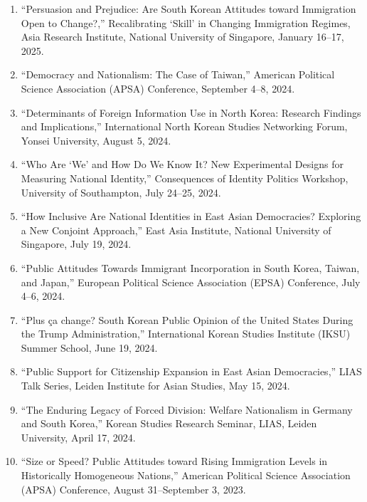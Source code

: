 \documentclass[11pt, a4paper]{article}
\begin{document}
\begin{enumerate}[itemsep=0.05em]
  \item ``Persuasion and Prejudice: Are South Korean Attitudes toward Immigration Open to Change?,'' Recalibrating `Skill' in Changing Immigration Regimes, Asia Research Institute, National University of Singapore, January 16--17, 2025.

  \item ``Democracy and Nationalism: The Case of Taiwan,'' American Political Science Association (APSA) Conference, September 4--8, 2024.

  \item ``Determinants of Foreign Information Use in North Korea: Research Findings and Implications,'' International North Korean Studies Networking Forum, Yonsei University, August 5, 2024.

  \item ``Who Are `We' and How Do We Know It? New Experimental Designs for Measuring National Identity,'' Consequences of Identity Politics Workshop, University of Southampton, July 24--25, 2024.

  \item ``How Inclusive Are National Identities in East Asian Democracies? Exploring a New Conjoint Approach,'' East Asia Institute, National University of Singapore, July 19, 2024.

  \item ``Public Attitudes Towards Immigrant Incorporation in South Korea, Taiwan, and Japan,'' European Political Science Association (EPSA) Conference, July 4--6, 2024.

  \item ``Plus \c{c}a change? South Korean Public Opinion of the United States During the Trump Administration,'' International Korean Studies Institute (IKSU) Summer School, June 19, 2024.

  \item ``Public Support for Citizenship Expansion in East Asian Democracies,'' LIAS Talk Series, Leiden Institute for Asian Studies, May 15, 2024.

  \item ``The Enduring Legacy of Forced Division: Welfare Nationalism in Germany and South Korea,'' Korean Studies Research Seminar, LIAS, Leiden University, April 17, 2024.

  \item ``Size or Speed? Public Attitudes toward Rising Immigration Levels in Historically Homogeneous Nations,'' American Political Science Association (APSA) Conference, August 31--September 3, 2023.


\end{enumerate}
\end{document}

